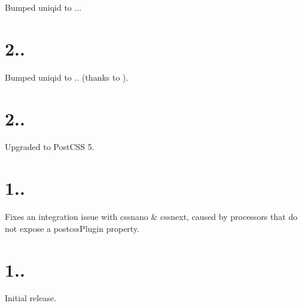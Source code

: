 
\begin{DoxyItemize}
\item Bumped uniqid to {..}.
\end{DoxyItemize}

\section*{2..}


\begin{DoxyItemize}
\item Bumped uniqid to {..} (thanks to ).
\end{DoxyItemize}

\section*{2..}


\begin{DoxyItemize}
\item Upgraded to Post\+C\+SS 5.
\end{DoxyItemize}

\section*{1..}


\begin{DoxyItemize}
\item Fixes an integration issue with cssnano \& cssnext, caused by processors that do not expose a {\ttfamily postcss\+Plugin} property.
\end{DoxyItemize}

\section*{1..}


\begin{DoxyItemize}
\item Initial release. 
\end{DoxyItemize}